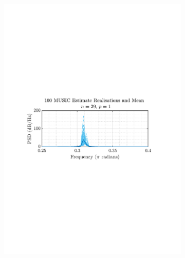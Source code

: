 \documentclass[12pt]{article}
\numberwithin{equation}{section}
\begin{document}
	\begin{figure}[H]
		\centering
		\begin{subfigure}{0.49\textwidth}
			\centering
			\includegraphics[trim={2.2cm 11cm 3.15cm  11.2cm}, clip, width=\textwidth]{../MATLAB/figures/q1_3e_fig01.pdf} 
		\end{subfigure}
		\begin{subfigure}{0.49\textwidth}
			\centering

\end{subfigure}
\end{figure}
\end{document}

